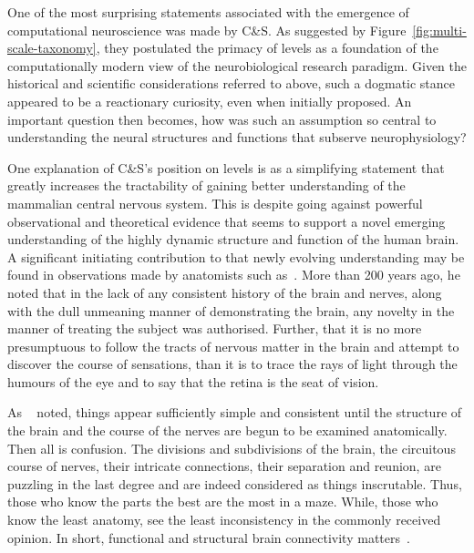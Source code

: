 \documentclass[11pt,3p,twocolumn]{JMN}
\begin{document}
One of the most surprising statements associated with the emergence of computational neuroscience was made by C\&S. As suggested by Figure~\ref{fig:multi-scale-taxonomy}, they postulated the primacy of levels as a foundation of the computationally modern view of the neurobiological research paradigm. Given the historical and scientific considerations referred to above, such a dogmatic stance appeared to be a reactionary curiosity, even when initially proposed. An important question then becomes, how was such an assumption so central to understanding the neural structures and functions that subserve neurophysiology?

One explanation of C\&S's position on levels is as a simplifying statement that greatly increases the tractability of gaining better understanding of the mammalian central nervous system. This is despite going against powerful observational and theoretical evidence that seems to support a novel emerging understanding of the highly dynamic structure and function of the human brain. A significant initiating contribution to that newly evolving understanding may be found in observations made by anatomists such as~\citet{bell11}. More than 200 years ago, he noted that in the lack of any consistent history of the brain and nerves, along with the dull unmeaning manner of demonstrating the brain, any novelty in the manner of treating the subject was authorised. Further, that it is no more presumptuous to follow the tracts of nervous matter in the brain and attempt to discover the course of sensations, than it is to trace the rays of light through the humours of the eye and to say that the retina is the seat of vision.

As ~\citet{bell11} noted, things appear sufficiently simple and consistent until the structure of the brain and the course of the nerves are begun to be examined anatomically. Then all is confusion. The divisions and subdivisions of the brain, the circuitous course of nerves, their intricate connections, their separation and reunion, are puzzling in the last degree and are indeed considered as things inscrutable. Thus, those who know the parts the best are the most in a maze. While, those who know the least anatomy, see the least inconsistency in the commonly received opinion. In short, functional and structural brain connectivity matters~\citep[see, for example,][]{gili18}.
\end{document}
